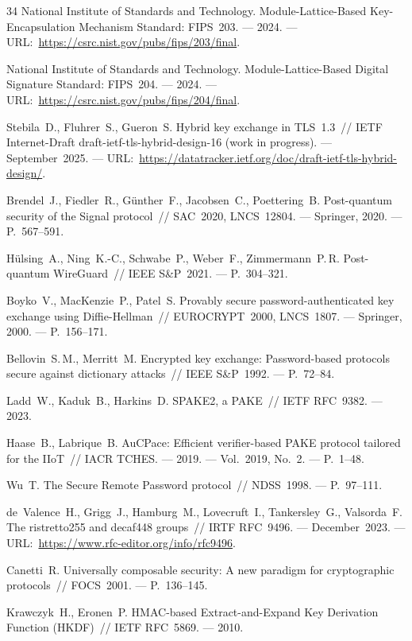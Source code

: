 \documentclass{llncs}
\begin{document}
\begin{thebibliography}{34}
National Institute of Standards and Technology.
Module-Lattice-Based Key-Encapsulation Mechanism Standard: FIPS~203. --- 2024. ---
URL:~\url{https://csrc.nist.gov/pubs/fips/203/final}.

National Institute of Standards and Technology.
Module-Lattice-Based Digital Signature Standard: FIPS~204. --- 2024. ---
URL:~\url{https://csrc.nist.gov/pubs/fips/204/final}.

Stebila~D., Fluhrer~S., Gueron~S.
Hybrid key exchange in TLS~1.3~//
IETF Internet-Draft draft-ietf-tls-hybrid-design-16 (work in progress). ---
September~2025. ---
URL:~\url{https://datatracker.ietf.org/doc/draft-ietf-tls-hybrid-design/}.

Brendel~J., Fiedler~R., G\"{u}nther~F., Jacobsen~C., Poettering~B.
Post-quantum security of the Signal protocol~//
SAC~2020, LNCS~12804. --- Springer, 2020. --- P.~567--591.

H\"{u}lsing~A., Ning~K.-C., Schwabe~P., Weber~F., Zimmermann~P.\,R.
Post-quantum WireGuard~//
IEEE S\&P~2021. --- P.~304--321.

Boyko~V., MacKenzie~P., Patel~S.
Provably secure password-authenticated key exchange using Diffie-Hellman~//
EUROCRYPT~2000, LNCS~1807. --- Springer, 2000. --- P.~156--171.

Bellovin~S.\,M., Merritt~M.
Encrypted key exchange: Password-based protocols secure against dictionary attacks~//
IEEE S\&P~1992. --- P.~72--84.

Ladd~W., Kaduk~B., Harkins~D.
SPAKE2, a PAKE~// IETF RFC~9382. --- 2023.

Haase~B., Labrique~B.
AuCPace: Efficient verifier-based PAKE protocol tailored for the IIoT~//
IACR TCHES. --- 2019. --- Vol.~2019, No.~2. --- P.~1--48.

Wu~T.
The Secure Remote Password protocol~// NDSS~1998. --- P.~97--111.

de~Valence~H., Grigg~J., Hamburg~M., Lovecruft~I., Tankersley~G.,
Valsorda~F.
The ristretto255 and decaf448 groups~//
IRTF RFC~9496. --- December~2023. ---
URL:~\url{https://www.rfc-editor.org/info/rfc9496}.

Canetti~R.
Universally composable security: A new paradigm for cryptographic protocols~//
FOCS~2001. --- P.~136--145.

Krawczyk~H., Eronen~P.
HMAC-based Extract-and-Expand Key Derivation Function (HKDF)~//
IETF RFC~5869. --- 2010.


\end{thebibliography}
\end{document}
